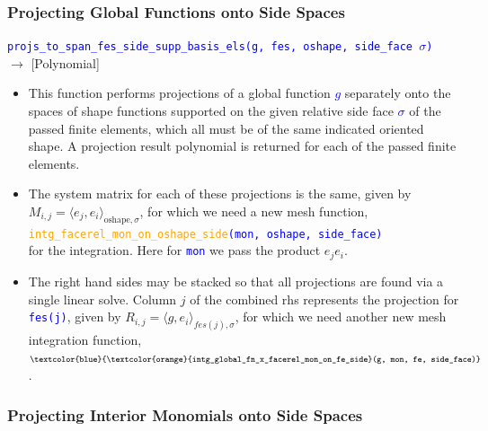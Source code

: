 \documentclass[compress]{beamer}
\begin{document}
\begin{frame}
  \frametitle{Projecting Global Functions onto Side Spaces}
  {\small \texttt{\textcolor{blue}{projs\_to\_span\_fes\_side\_supp\_basis\_els({\scriptsize g, fes, oshape, side\_face $\sigma$})}}}\\
  \hspace{0.5cm} $\rightarrow$ [Polynomial]\\
  \pause
  \begin{itemize}[<+->]
    \item This function performs projections of a global function \textcolor{blue}{$g$} separately onto the spaces of shape functions
      supported on the given relative side face \textcolor{blue}{$\sigma$} of the passed finite elements, which all must be of the
      same indicated oriented shape.  A projection result polynomial is returned for each of the passed finite elements.
    \item The system matrix for each of these projections is the same, given by
      $M_{i,j} = \langle e_j, e_i \rangle_{\text{oshape},\sigma}$, for which we need a new mesh function,\\
      \texttt{\small \textcolor{blue}{\textcolor{orange}{intg\_facerel\_mon\_on\_oshape\_side}(mon, oshape, side\_face)}}\\
      for the integration. Here for \texttt{\textcolor{blue}{mon}} we pass the product $e_j e_i$.
    \item The right hand sides may be stacked so that all projections are found via a single linear solve.
      Column $j$ of the combined rhs represents the projection for \texttt{\textcolor{blue}{fes(j)}}, given by
      $R_{i,j} = \langle g, e_i\rangle_{fes(j),\sigma}$, for which we need another new mesh integration function,
      $\texttt{\small \textcolor{blue}{\textcolor{orange}{intg\_global\_fn\_x\_facerel\_mon\_on\_fe\_side}(g, mon, fe, side\_face)}}$.
  \end{itemize} 
\end{frame}

\subsubsection{Projecting Interior Monomials onto Side Spaces}
\end{document}
